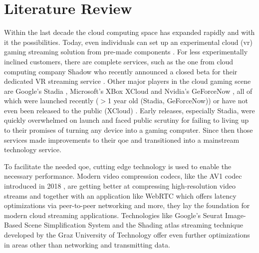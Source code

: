 \section{Literature Review}
\label{sec:lit}

Within the last decade the cloud computing space has expanded rapidly and with it the possibilities. Today, even individuals can set up an experimental cloud (\acrfull{vr}) gaming streaming solution from pre-made components \parencite{tayoexe} \parencite{clouddesktopguide}. For less experimentally inclined customers, there are complete services, such as the one from cloud computing company Shadow \parencite{shadow} who recently announced a closed beta for their dedicated VR streaming service \parencite{shadowvr}. Other major players in the cloud gaming scene are Google's Stadia \parencite{stadia}, Microsoft's XBox XCloud \parencite{xcloud} and Nvidia's GeForceNow \parencite{geforcenow}, all of which were launched recently ($>$1 year old (Stadia, GeForceNow)) or have not even been released to the public (XCloud) . Early releases, especially Stadia, were quickly overwhelmed on launch and faced public scrutiny for failing to living up to their promises of turning any device into a gaming computer. Since then those services made improvements to their \acrfull{qoe} and transitioned into a mainstream technology service.

To facilitate the needed \acrshort{qoe}, cutting edge technology is used to enable the necessary performance. Modern video compression codecs, like the AV1 codec introduced in 2018 \parencite{av1}, are getting better at compressing high-resolution video streams and together with an application like WebRTC \parencite{webRTC} which offers latency optimizations via peer-to-peer networking and more, they lay the foundation for modern cloud streaming applications. Technologies like Google's Seurat Image\hyp{}Based Scene Simplification System \parencite{seurat} and the Shading atlas streaming technique developed by the Graz University of Technology \parencite{sas} offer even further optimizations in areas other than networking and transmitting data. 

